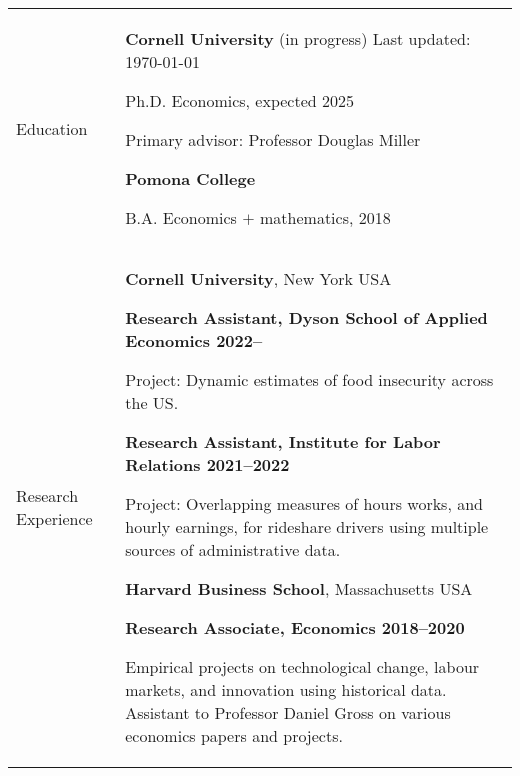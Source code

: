 \documentclass[letterpaper,11pt,oneside]{article}
\begin{document}
\noindent
\begin{tabular}[\textwidth]{p{} p{}}
    \Large{Education}
    & \textbf{Cornell University} (in progress)  \hfill Last updated: \today

    Ph.D. Economics, expected 2025 
    
    Primary advisor: Professor Douglas Miller \vspace{0.1cm}
    
    \textbf{Pomona College}

    B.A. Economics $+$ mathematics, 2018 \vspace{0.2cm} \\
    
    
    
\Large{Research Experience}
    & \textbf{Cornell University}, New York USA
    
    \textbf{Research Assistant, Dyson School of Applied Economics 2022--}

    Project: Dynamic estimates of food insecurity across the US.
    
    \textbf{Research Assistant, Institute for Labor Relations 2021--2022}

    Project: Overlapping measures of hours works, and hourly earnings, for rideshare drivers using multiple sources of administrative data.
    \vspace{0.2cm}
    

    \textbf{Harvard Business School}, Massachusetts USA
    
    \textbf{Research Associate, Economics 2018--2020}
    
    Empirical projects on technological change, labour markets, and innovation using historical data.
    Assistant to Professor Daniel Gross on various economics papers and projects.
    \vspace{0.2cm} \\


\end{tabular}
\end{document}
